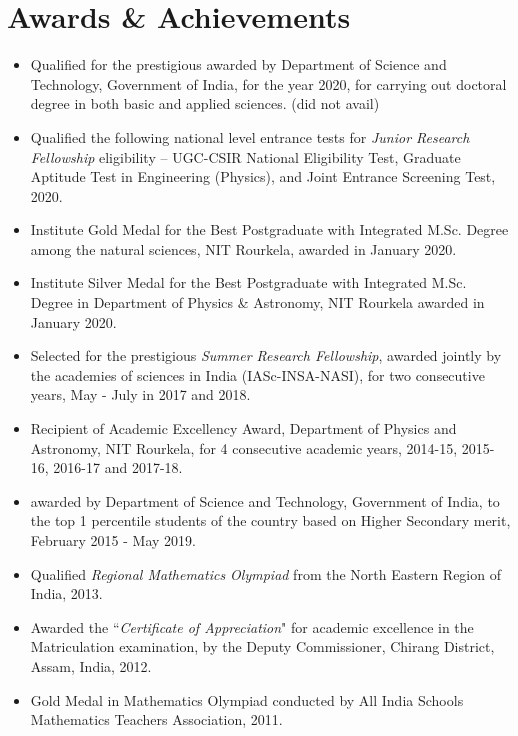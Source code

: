 \documentclass[11pt, letterpaper]{article}
\let\oldhref\href
\renewcommand{\href}[3][blue]{\oldhref{#2}{\color{#1}{#3}}}
\begin{document}
	\section{Awards \& Achievements}
	\begin{itemize}%
		\item Qualified for the prestigious \href{https://online-inspire.gov.in/Account/INSPIREProgramme}{INSPIRE Fellowship} awarded by Department of Science and Technology, Government of India, for the year 2020, for carrying out doctoral degree in both basic and applied sciences. (did not avail)
		
		\item Qualified the following national level entrance tests for \emph{Junior Research Fellowship} eligibility -- UGC-CSIR National Eligibility Test, Graduate Aptitude Test in Engineering (Physics), and Joint Entrance Screening Test, 2020.
		
		\item Institute Gold Medal for the Best Postgraduate with Integrated M.Sc. Degree among the natural sciences, NIT Rourkela, awarded in January 2020.
		
		\item Institute Silver Medal for the Best Postgraduate with Integrated M.Sc. Degree in Department of Physics \& Astronomy, NIT Rourkela awarded in January 2020.
		
		\item Selected for the prestigious \emph{Summer Research Fellowship}, awarded jointly by the academies of sciences in India (IASc-INSA-NASI), for two consecutive years, May - July in 2017 and 2018.
		
		\item Recipient of Academic Excellency Award, Department of Physics and Astronomy, NIT Rourkela, for 4 consecutive academic years, 2014-15, 2015-16, 2016-17 and 2017-18.
		
		\item \href{https://online-inspire.gov.in/Account/INSPIREProgramme}{INSPIRE Scholarship} awarded by Department of Science and Technology, Government of India, to the top 1 percentile students of the country based on Higher Secondary merit, February 2015 - May 2019.
		
		\item Qualified \emph{Regional Mathematics Olympiad} from the North Eastern Region of India, 2013.
		
		\item Awarded the ``\textit{Certificate of Appreciation}" for academic excellence in the Matriculation examination, by the Deputy Commissioner, Chirang District, Assam, India, 2012.
		
		\item Gold Medal in Mathematics Olympiad conducted by All India Schools Mathematics Teachers Association, 2011.
	\end{itemize}
	
\end{document}
